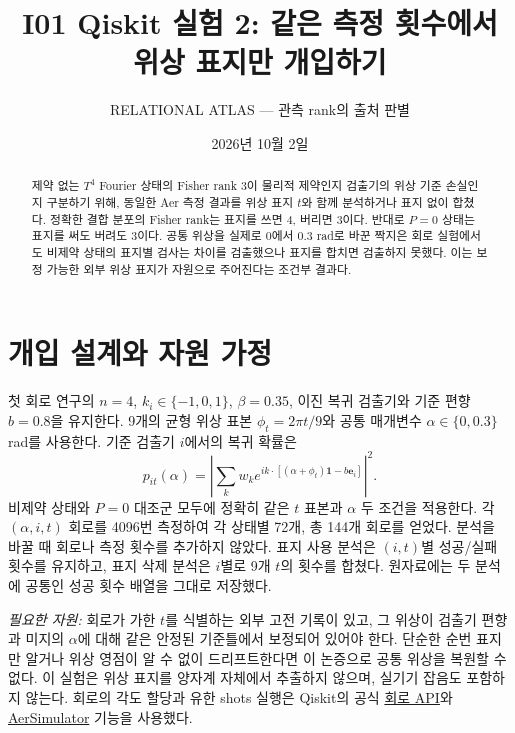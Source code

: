 \documentclass[11pt,a4paper]{article}
\title{I01 Qiskit 실험 2: 같은 측정 횟수에서 위상 표지만 개입하기}
\author{RELATIONAL ATLAS --- 관측 rank의 출처 판별}
\date{2026년 10월 2일}
\begin{document}
\maketitle

\begin{abstract}
제약 없는 $T^4$ Fourier 상태의 Fisher rank 3이 물리적 제약인지
검출기의 위상 기준 손실인지 구분하기 위해, 동일한 Aer 측정 결과를
위상 표지 $t$와 함께 분석하거나 표지 없이 합쳤다. 정확한 결합
분포의 Fisher rank는 표지를 쓰면 4, 버리면 3이다. 반대로
$P=0$ 상태는 표지를 써도 버려도 3이다. 공통 위상을 실제로
$0$에서 $0.3$ rad로 바꾼 짝지은 회로 실험에서도 비제약 상태의
표지별 검사는 차이를 검출했으나 표지를 합치면 검출하지 못했다.
이는 보정 가능한 외부 위상 표지가 자원으로 주어진다는 조건부 결과다.
\end{abstract}

\section{개입 설계와 자원 가정}
첫 회로 연구의 $n=4$, $k_i\in\{-1,0,1\}$, $\beta=0.35$,
이진 복귀 검출기와 기준 편향 $b=0.8$을 유지한다.
9개의 균형 위상 표본 $\phi_t=2\pi t/9$와
공통 매개변수 $\alpha\in\{0,0.3\}$ rad를 사용한다.
기준 검출기 $i$에서의 복귀 확률은
\begin{equation}
 p_{it}(\alpha)=\left|\sum_k w_k
 e^{i k\cdot[(\alpha+\phi_t)\boldsymbol1-b\boldsymbol e_i]}\right|^2.
\end{equation}
비제약 상태와 $P=0$ 대조군 모두에 정확히 같은 $t$ 표본과
$\alpha$ 두 조건을 적용한다. 각 $(\alpha,i,t)$ 회로를 4096번
측정하여 각 상태별 72개, 총 144개 회로를 얻었다. 분석을 바꿀 때
회로나 측정 횟수를 추가하지 않았다. 표지 사용 분석은 $(i,t)$별
성공/실패 횟수를 유지하고, 표지 삭제 분석은 $i$별로 9개 $t$의
횟수를 합쳤다. 원자료에는 두 분석에 공통인 성공 횟수 배열을
그대로 저장했다.

\emph{필요한 자원:} 회로가 가한 $t$를 식별하는 외부 고전 기록이
있고, 그 위상이 검출기 편향과 미지의 $\alpha$에 대해 같은 안정된
기준틀에서 보정되어 있어야 한다. 단순한 순번 표지만 알거나
위상 영점이 알 수 없이 드리프트한다면 이 논증으로 공통 위상을
복원할 수 없다. 이 실험은 위상 표지를 양자계 자체에서 추출하지
않으며, 실기기 잡음도 포함하지 않는다. 회로의 각도 할당과 유한
shots 실행은 Qiskit의 공식
\href{https://quantum.cloud.ibm.com/docs/en/api/qiskit/2.4/qiskit.circuit.QuantumCircuit}{회로 API}와
\href{https://qiskit.github.io/qiskit-aer/stubs/qiskit_aer.AerSimulator.html}{AerSimulator}
기능을 사용했다.
\end{document}
